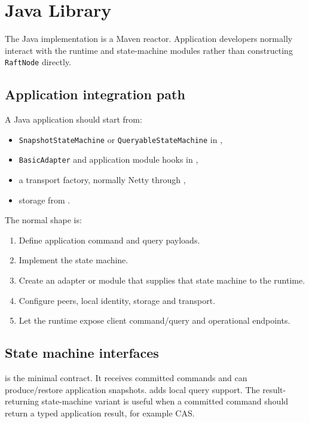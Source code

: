 \section{Java Library}
\label{sec:JavaLibrary}

The Java implementation is a Maven reactor. Application developers normally
interact with the runtime and state-machine modules rather than constructing
\texttt{RaftNode} directly.

\subsection{Application integration path}

A Java application should start from:

\begin{itemize}
\item \texttt{SnapshotStateMachine} or \texttt{QueryableStateMachine} in
,
\item \texttt{BasicAdapter} and application module hooks in ,
\item a transport factory, normally Netty through ,
\item storage from .
\end{itemize}

The normal shape is:

\begin{enumerate}
\item Define application command and query payloads.
\item Implement the state machine.
\item Create an adapter or module that supplies that state machine to the runtime.
\item Configure peers, local identity, storage and transport.
\item Let the runtime expose client command/query and operational endpoints.
\end{enumerate}

\subsection{State machine interfaces}

 is the minimal contract. It receives committed
commands and can produce/restore application snapshots. 
adds local query support. The result-returning state-machine variant is useful
when a committed command should return a typed application result, for example
CAS.

